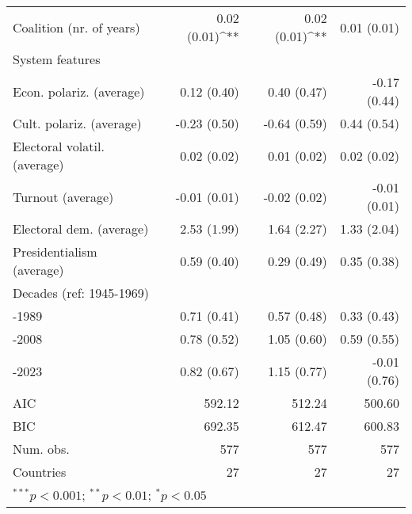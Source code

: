 \begin{table}[h!]
\begin{center}
\begin{tabular}{l@{} D{)}{)}{9)3}@{} D{)}{)}{9)3}@{} D{)}{)}{9)3}@{}}
\quad Coalition (nr. of years)     & 0.02 \; (0.01)^{**}  & 0.02 \; (0.01)^{**}  & 0.01 \; (0.01)       \\
System features                    &                      &                      &                      \\
\quad Econ. polariz. (average)     & 0.12 \; (0.40)       & 0.40 \; (0.47)       & -0.17 \; (0.44)      \\
\quad Cult. polariz. (average)     & -0.23 \; (0.50)      & -0.64 \; (0.59)      & 0.44 \; (0.54)       \\
\quad Electoral volatil. (average) & 0.02 \; (0.02)       & 0.01 \; (0.02)       & 0.02 \; (0.02)       \\
\quad Turnout (average)            & -0.01 \; (0.01)      & -0.02 \; (0.02)      & -0.01 \; (0.01)      \\
\quad Electoral dem. (average)     & 2.53 \; (1.99)       & 1.64 \; (2.27)       & 1.33 \; (2.04)       \\
\quad Presidentialism (average)    & 0.59 \; (0.40)       & 0.29 \; (0.49)       & 0.35 \; (0.38)       \\
Decades (ref: 1945-1969)           &                      &                      &                      \\
-1989                    & 0.71 \; (0.41)       & 0.57 \; (0.48)       & 0.33 \; (0.43)       \\
-2008                    & 0.78 \; (0.52)       & 1.05 \; (0.60)       & 0.59 \; (0.55)       \\
-2023                    & 0.82 \; (0.67)       & 1.15 \; (0.77)       & -0.01 \; (0.76)      \\
\midrule
AIC                                & 592.12               & 512.24               & 500.60               \\
BIC                                & 692.35               & 612.47               & 600.83               \\
Num. obs.                          & 577                  & 577                  & 577                  \\
Countries                          & 27                   & 27                   & 27                   \\
\bottomrule
{}
\end{tabular}
\label{table:mlm_reg_table_all}
\end{center}
\end{table}

